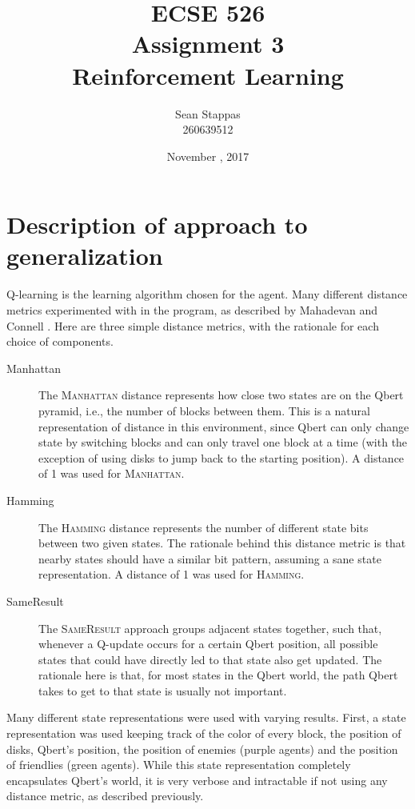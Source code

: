 \documentclass[a4paper,titlepage]{article}
\title{
	\textbf{ECSE 526 \\ Assignment 3}
	\\ \large Reinforcement Learning
}
\author{Sean Stappas \\ 260639512}
\date{November \nth{7}, 2017}
\begin{document}
	\sloppy
	\maketitle
	\twocolumn
	
	\section{Description of approach to generalization} \label{sec:generalization_description}
	
	Q-learning is the learning algorithm chosen for the agent. Many different distance metrics experimented with in the program, as described by Mahadevan and Connell \cite{mahadevan}. Here are three simple distance metrics, with the rationale for each choice of components.
	
	\begin{description}
		\item[Manhattan] The \textsc{Manhattan} distance represents how close two states are on the Qbert pyramid, i.e., the number of blocks between them. This is a natural representation of distance in this environment, since Qbert can only change state by switching blocks and can only travel one block at a time (with the exception of using disks to jump back to the starting position). A distance of 1 was used for \textsc{Manhattan}.
		
		\item[Hamming] The \textsc{Hamming} distance represents the number of different state bits between two given states. The rationale behind this distance metric is that nearby states should have a similar bit pattern, assuming a sane state representation. A distance of 1 was used for \textsc{Hamming}.
		
		\item[SameResult] The \textsc{SameResult} approach groups adjacent states together, such that, whenever a Q-update occurs for a certain Qbert position, all possible states that could have directly led to that state also get updated. The rationale here is that, for most states in the Qbert world, the path Qbert takes to get to that state is usually not important.
	\end{description}
	
	Many different state representations were used with varying results. First, a state representation was used keeping track of the color of every block, the position of disks, Qbert's position, the position of enemies (purple agents) and the position of friendlies (green agents). While this state representation completely encapsulates Qbert's world, it is very verbose and intractable if not using any distance metric, as described previously.
	
\end{document}
